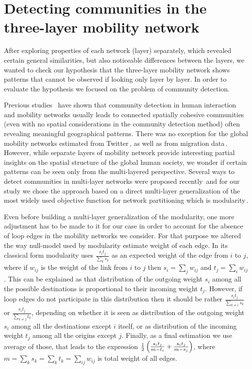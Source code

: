 \documentclass[aps,superscriptaddress,showkeys,nofootinbib]{revtex4-1}
\begin{document}
\section{Detecting communities in the three-layer mobility network}
\label{sec:community_detection}

After exploring properties of each network (layer) separately, which revealed certain general similarities, but also noticeable differences between the layers, we wanted to check our hypothesis that the three-layer mobility network shows patterns that cannot be observed if looking only layer by layer. In order to evaluate the hypothesis we focused on the problem of community detection. 

Previous studies~\cite{ratti2010redrawing,sobolevsky2013delineating} have shown that community detection in human interaction and mobility networks usually leads to connected spatially cohesive communities (even with no spatial considerations in the community detection method) often revealing meaningful geographical patterns. There was no exception for the global mobility networks estimated from Twitter\,\cite{hawelka2014}, as well as from migration data\,\cite{fagiolo2013international}. However, while separate layers of mobility network provide interesting partial insights on the spatial structure of the global human society, we wonder if certain patterns can be seen only from the multi-layered perspective.
Several ways to detect communities in multi-layer networks were proposed recently\,\cite{mucha2010community,tang2012community} and for our study we chose the approach based on a direct multi-layer generalization of the most widely used objective function for network partitioning which is modularity\,\cite{newman2004,newman2006}.

Even before building a multi-layer generalization of the modularity, one more adjustment has to be made to it for our case in order to account for the absence of loop edges in the mobility networks we consider. For that purpose we altered the way null-model used by modularity estimate weight of each edge. In its classical form modularity uses $\frac{s_i t_j}{\sum_{k}{s_k}}$ as an expected weight of the edge from $i$ to $j$, where if $w_{ij}$ is the weight of the link from $i$ to $j$ then $s_i=\sum_j w_{ij}$ and $t_j=\sum_i w_{ij}$. This can be explained as that distribution of the outgoing weight $s_i$ among all the possible destinations is proportional to their incoming weight $t_j$. However, if loop edges do not participate in this distribution then it should be rather
$\frac{s_i t_j}{\sum_{k\ne i}{s_k}}$ or $\frac{s_i t_j}{\sum_{k\ne j}{t_k}}$, depending on whether it is seen as distribution of the outgoing weight $s_i$ among all the destinations except $i$ itself, or as distribution of the incoming weight $t_j$ among all the origins except $j$. Finally, as a final estimation we use average of those, that leads to the expression
${1 \over 2} \left(\frac{s_i t_j}{m - t_i} + \frac{s_i t_j}{m - s_j}\right)$, where $m = \sum_{k}{s_k} = \sum_{k}{t_k} = \sum_{ij}{w_{ij}}$ is total weight of all edges.
\end{document}
